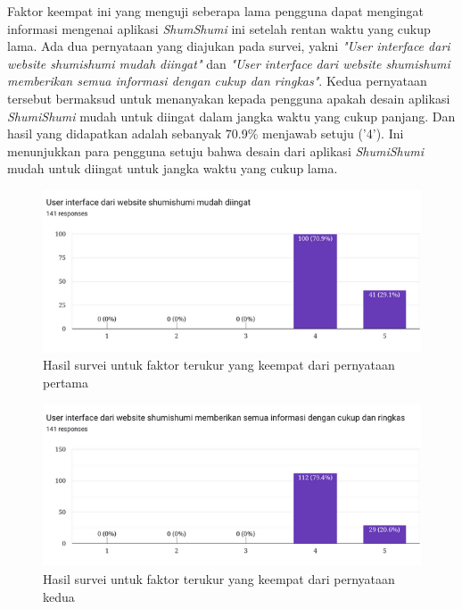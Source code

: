 \documentclass[a4paper]{article}
\begin{document}
\begin{enumerate}
\begin{itemize}
        Faktor keempat ini yang menguji seberapa lama pengguna dapat mengingat informasi mengenai aplikasi \textit{ShumShumi} ini setelah rentan waktu yang cukup lama. Ada dua pernyataan yang diajukan pada survei, yakni \textit{"User interface dari website shumishumi mudah diingat"} dan \textit{"User interface dari website shumishumi memberikan semua informasi dengan cukup dan ringkas"}. Kedua pernyataan tersebut bermaksud untuk menanyakan kepada pengguna apakah desain aplikasi \textit{ShumiShumi} mudah untuk diingat dalam jangka waktu yang cukup panjang. Dan hasil yang didapatkan adalah sebanyak 70.9\% menjawab setuju ('4'). Ini menunjukkan para pengguna setuju bahwa desain dari aplikasi \textit{ShumiShumi} mudah untuk diingat untuk jangka waktu yang cukup lama. 

        \newpage
        \begin{figure}[h]
            \centering
            \includegraphics[scale=0.50]{images/evaluasi ui user 2/Survei 2 - Pertanyaan 3.png}
            \caption{Hasil survei untuk faktor terukur yang keempat dari pernyataan pertama}
        \end{figure}

        \begin{figure}[h]
            \centering
            \includegraphics[scale=0.50]{images/evaluasi ui user 2/Survei 2 - Pertanyaan 5.png}
            \caption{Hasil survei untuk faktor terukur yang keempat dari pernyataan kedua}
        \end{figure}


\end{itemize}
\end{enumerate}
\end{document}
